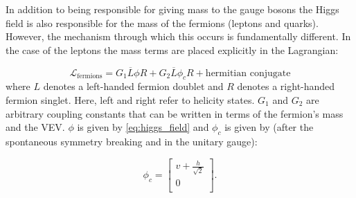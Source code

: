In addition to being responsible for giving mass to the gauge bosons the Higgs field is also responsible for the mass of the fermions (leptons and quarks). However, the mechanism through which this occurs is fundamentally different. In the case of the leptons the mass terms are placed explicitly in the Lagrangian:

\begin{equation}
	\mathcal{L}_{\text{fermions}}=G_1 \overline{L}\phi R + G_2 \overline{L}\phi_c R + \text{hermitian conjugate}
	\label{eq:fermions_mass}
\end{equation}
where $L$ denotes a left-handed fermion doublet and $R$ denotes a right-handed fermion singlet. Here, left and right refer to helicity states. $G_1$ and $G_2$ are arbitrary coupling constants that can be written in terms of the fermion's mass and the VEV. $\phi$ is given by \ref{eq:higgs_field} and $\phi_c$ is given by (after the spontaneous symmetry breaking and in the unitary gauge):

\begin{equation}
	\phi_c=\begin{bmatrix}
	v+\frac{h}{\sqrt{2}} \\
	0 \\
	\end{bmatrix}.
\end{equation}

